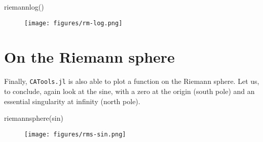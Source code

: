 \documentclass[a4paper]{article}
\begin{document}
\begin{juliaverbatim}
	riemannlog()
\end{juliaverbatim}
\begin{figure}[H]
	\centering
	\texttt{[image: figures/rm-log.png]}
\end{figure}

\section{On the Riemann sphere}

Finally, \texttt{CATools.jl} is also able to plot a function on the Riemann
sphere.  Let us, to conclude, again look at the sine, with a zero at the origin
(south pole) and an essential singularity at infinity (north pole).

\begin{juliaverbatim}
	riemannsphere(sin)
\end{juliaverbatim}
\begin{figure}[H]
	\centering
	\texttt{[image: figures/rms-sin.png]}
\end{figure}
\end{document}
